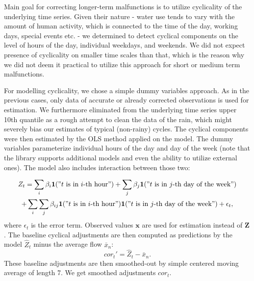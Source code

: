 \documentclass[12pt,a4paper]{article}
\begin{document}
Main goal for correcting longer-term malfunctions is to utilize cyclicality of the underlying time series. Given their nature - water use tends to vary with the amount of human activity, which is connected to the time of the day, working days, special events etc. -  we determined to detect cyclical components on the level of hours of the day, individual weekdays, and  weekends. We did not expect presence of cyclicality on smaller time scales than that, which is the reason why we did not deem it practical to utilize this approach for short or medium term malfunctions.

For modelling cyclicality, we chose a simple dummy variables approach. As in the previous cases, only data of accurate or already corrected observations is used for estimation. We furthermore eliminated from the underlying time series upper 10th quantile as a rough attempt to clean the data of the rain, which might severely bias our estimates of typical (non-rainy) cycles. The cyclical components were then estimated by the OLS method applied on the model.
The dummy variables parameterize individual hours of the day and day of the week (note that the library supports additional models and even the ability to utilize external ones). The model also includes interaction between those two:

\begin{multline}
    Z_t = \sum_{i} \beta_i \mathbf{1}("t\text{ is in $i$-th hour}") + \sum_{j}\beta_j \mathbf{1}("t\text{ is in $j$-th day of the week}") \\
    + \sum_{i}\sum_{j} \beta_{ij} \mathbf{1}("t\text{ is in $i$-th hour}")\mathbf{1}("t\text{ is in $j$-th day of the week}")+\epsilon_t,
\end{multline}
where $\epsilon_t$ is the error term. Observed values $\mathbf{x}$ are used for estimation instead of $\mathbf{Z}$. The baseline cyclical adjustments are then computed as predictions by the model $\hat Z_t$ minus the average flow $\bar x_n$:
\[
cor_t' = \hat Z_t - \bar x_n.
\]
These baseline adjustments are then smoothed-out by simple centered moving average of length 7. We get smoothed adjustments $cor_t$.

\end{document}
